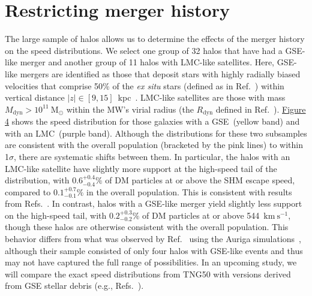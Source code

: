 \documentclass[aps,prl,reprint,superscriptaddress,nopreprintnumbers,nobibnotes,floatfix,longbibliography,footinbib]{revtex4-2}
\newcommand{\TNGfifty}{TNG50}
\newcommand{\kms}{\ensuremath{\text{km}~\mathrm{s}^{-1}}}
\newcommand{\Msun}{\ensuremath{\mathrm{M}_\odot}}
\newcommand{\Mdyn}{\ensuremath{M_\mathrm{dyn}}}
\begin{document}
\section{Restricting merger history}
\label{sec:5}
The large sample of halos allows us to determine the effects of the merger history on the speed distributions. We select one group of 32 halos that have had a GSE-like merger and another group of 11 halos with LMC-like satellites. Here, GSE-like mergers are identified as those that deposit stars with highly radially biased velocities that comprise 50\% of the \emph{ex situ} stars (defined as in Ref.~\citep{Folsom25}) within vertical distance $|z| \in [9, 15]$~kpc~\citep{Belokurov18,Deason18,Myeong18,Lancaster19,Necib19a,Fattahi19,Iorio21}. LMC-like satellites are those with mass $\Mdyn > 10^{11}~\Msun$ within the MW's virial radius (the $R_\mathrm{dyn}$ defined in Ref.~\cite{Folsom25}). \hyperref[fig:4]{Figure 4} shows the speed distribution for those galaxies with a GSE~(yellow band) and with an LMC~(purple band). Although the distributions for these two subsamples are consistent with the overall population (bracketed by the pink lines) to within 1$\sigma$, there are systematic shifts between them. In particular, the halos with an LMC-like satellite have slightly more support at the high-speed tail of the distribution, with $0.6^{+0.4}_{-0.4}\%$ of DM particles at or above the SHM escape speed, compared to $0.1^{+0.7}_{-0.1}\%$ in the overall population. This is consistent with results from Refs.~\citep{Besla19, Donaldson22, Smith-Orlik23}. In contrast, halos with a GSE-like merger yield slightly less support on the high-speed tail, with $0.2^{+0.3}_{-0.2}\%$ of DM particles at or above 544~\kms{}, though these halos are otherwise consistent with the overall population. This behavior differs from what was observed by Ref.~\cite{Bozorgnia20} using the Auriga simulations~\citep{Grand17}, although their sample consisted of only four halos with GSE-like events and thus may not have captured the full range of possibilities. In an upcoming study, we will compare the exact speed distributions from \TNGfifty{} with versions derived from GSE stellar debris (e.g., Refs.~\cite{Necib19a, Evans18,Zhu24}).
\end{document}
